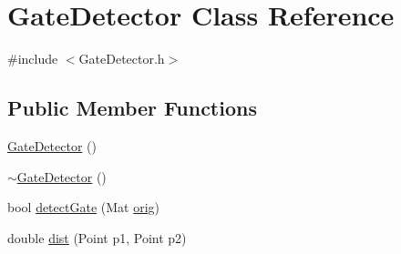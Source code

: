 \hypertarget{classGateDetector}{}\section{Gate\+Detector Class Reference}
\label{classGateDetector}


{\ttfamily \#include $<$Gate\+Detector.\+h$>$}

\subsection*{Public Member Functions}
\begin{DoxyCompactItemize}
\item 
\hyperlink{classGateDetector_a1b77579b6a41d523fe7ab9f3696050da}{Gate\+Detector} ()
\item 
\hyperlink{classGateDetector_a28bdb879e84b651f87a98085998547b4}{$\sim$\+Gate\+Detector} ()
\item 
bool \hyperlink{classGateDetector_ae854ee30952a3fb59a122d52a64b3b7a}{detect\+Gate} (Mat \hyperlink{qualification__task_8cpp_ae544386e0f095e03d639cf884b7a8a1b}{orig})
\item 
double \hyperlink{classGateDetector_acc50c293920790d445bfaea70e17b0b9}{dist} (Point p1, Point p2)
\end{DoxyCompactItemize}
